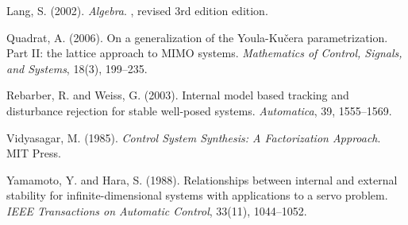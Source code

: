 \documentclass[11pt, a4paper]{amsart}
\begin{document}
\begin{thebibliography}{12}
	Lang, S. (2002).
	\newblock \emph{Algebra}.
	, revised 3rd edition edition.
	
	Quadrat, A. (2006).
	\newblock On a generalization of the {Y}oula-{K}u\v{c}era parametrization.
	{P}art {II}: the lattice approach to {MIMO} systems.
	\newblock \emph{Mathematics of Control, Signals, and Systems}, 18(3), 199--235.
	
	Rebarber, R. and Weiss, G. (2003).
	\newblock Internal model based tracking and disturbance rejection for stable
	well-posed systems.
	\newblock \emph{Automatica}, 39, 1555--1569.
	
	Vidyasagar, M. (1985).
	\newblock \emph{Control System Synthesis: A Factorization Approach}.
	\newblock MIT Press.
	
	Yamamoto, Y. and Hara, S. (1988).
	\newblock Relationships between internal and external stability for
	infinite-dimensional systems with applications to a servo problem.
	\newblock \emph{IEEE Transactions on Automatic Control}, 33(11), 1044--1052.
	
\end{thebibliography}
\end{document}
